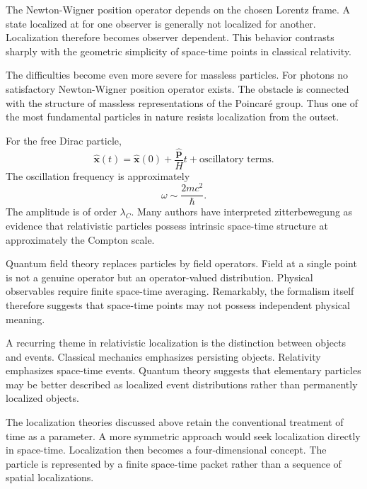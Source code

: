 The Newton-Wigner position operator depends on the chosen Lorentz frame.
A state localized at
for one observer is generally not localized for another.
Localization therefore becomes observer dependent.
This behavior contrasts sharply with the geometric simplicity of space-time
points in classical relativity.

The difficulties become even more severe for massless particles.
For photons no satisfactory Newton-Wigner position operator exists.
The obstacle is connected with the structure of massless representations
of the Poincaré group.
Thus one of the most fundamental particles in nature resists localization 
from the outset.

For the free Dirac particle,
\begin{equation}
    \label{zbw}
\hat{\mathbf{x}}(t) = \hat{\mathbf{x}}(0)+\frac{\hat{\mathbf{p}}}{H}t
+\text{oscillatory terms}.
\end{equation}
The oscillation frequency is approximately
\begin{equation}
    \label{zbw-fr}
\omega \sim \frac{2mc^2}{\hbar}.
\end{equation}
The amplitude is of order $ \lambda_C. $
Many authors have interpreted zitterbewegung as evidence that relativistic
particles possess intrinsic space-time structure at approximately 
the Compton scale.

Quantum field theory replaces particles by field operators.
Field at a single point is not a genuine operator but an operator-valued 
distribution.
Physical observables require finite space-time averaging.
Remarkably, the formalism itself therefore suggests that space-time points
may not possess independent physical meaning.

A recurring theme in relativistic localization is the distinction 
between objects and events.
Classical mechanics emphasizes persisting objects.
Relativity emphasizes space-time events.
Quantum theory suggests that elementary particles may be better described as
localized event distributions rather than permanently localized objects.

The localization theories discussed above retain the conventional 
treatment of time as a parameter.
A more symmetric approach would seek localization directly in space-time.
Localization then becomes a four-dimensional concept.
The particle is represented by a finite space-time packet rather 
than a sequence of spatial localizations.

